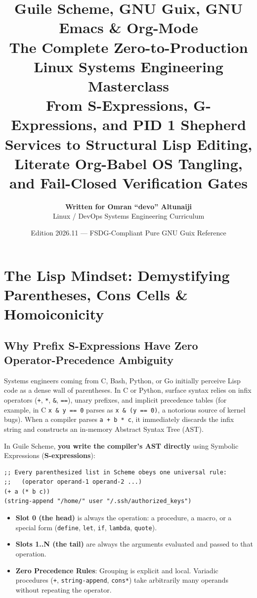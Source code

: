 \documentclass[11pt,oneside]{book}
\title{%
  \vspace{-1cm}
  {\Huge\bfseries\color{NavyBlue} Guile Scheme, GNU Guix, GNU Emacs \& Org-Mode}\\[0.6em]
  {\Large\bfseries\color{TealBlue} The Complete Zero-to-Production Linux Systems Engineering Masterclass}\\[1.2em]
  {\normalsize From S-Expressions, G-Expressions, and PID 1 Shepherd Services to Structural Lisp Editing, Literate Org-Babel OS Tangling, and Fail-Closed Verification Gates}
}
\author{\textbf{Written for Omran ``devo'' Altunaiji}\\Linux / DevOps Systems Engineering Curriculum}
\date{Edition 2026.11 --- FSDG-Compliant Pure GNU Guix Reference}
\begin{document}
\maketitle
\tableofcontents

\chapter{The Lisp Mindset: Demystifying Parentheses, Cons Cells \& Homoiconicity}

\section{Why Prefix S-Expressions Have Zero Operator-Precedence Ambiguity}

Systems engineers coming from C, Bash, Python, or Go initially perceive Lisp code as a dense wall of parentheses. In C or Python, surface syntax relies on infix operators (\texttt{+}, \texttt{*}, \texttt{\&}, \texttt{==}), unary prefixes, and implicit precedence tables (for example, in C \texttt{x \& y == 0} parses as \texttt{x \& (y == 0)}, a notorious source of kernel bugs). When a compiler parses \texttt{a + b * c}, it immediately discards the infix string and constructs an in-memory Abstract Syntax Tree (AST).

In Guile Scheme, \textbf{you write the compiler's AST directly} using Symbolic Expressions (\textbf{S-expressions}):

\begin{lstlisting}[language=GuileScheme]
;; Every parenthesized list in Scheme obeys one universal rule:
;;   (operator operand-1 operand-2 ...)
(+ a (* b c))
(string-append "/home/" user "/.ssh/authorized_keys")
\end{lstlisting}

\begin{itemize}[leftmargin=1.5em]
  \item \textbf{Slot 0 (the head)} is always the operation: a procedure, a macro, or a special form (\texttt{define}, \texttt{let}, \texttt{if}, \texttt{lambda}, \texttt{quote}).
  \item \textbf{Slots 1..N (the tail)} are always the arguments evaluated and passed to that operation.
  \item \textbf{Zero Precedence Rules}: Grouping is explicit and local. Variadic procedures (\texttt{+}, \texttt{string-append}, \texttt{cons*}) take arbitrarily many operands without repeating the operator.
\end{itemize}
\end{document}
